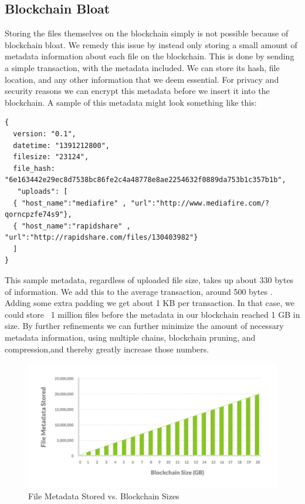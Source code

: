 \documentclass[a4paper,10pt]{article}
\begin{document}
\subsection{Blockchain Bloat}

Storing the files themselves on the blockchain simply is not possible because of blockchain bloat. We remedy this issue by instead only storing a small amount of metadata information about each file on the blockchain. This is done by sending a simple transaction, with the metadata included. We can store its hash, file location, and any other information that we deem essential. For privacy and security reasons we can encrypt this metadata before we insert it into the blockchain. A sample of this metadata might look something like this:\\

\begin{lstlisting}
{
  version: "0.1",
  datetime: "1391212800",
  filesize: "23124",
  file_hash: "6e163442e29ec8d7538bc86fe2c4a48778e8ae2254632f0889da753b1c357b1b",
   "uploads": [
  { "host_name":"mediafire" , "url":"http://www.mediafire.com/?qorncpzfe74s9"},
  { "host_name":"rapidshare" , "url":"http://rapidshare.com/files/130403982"}
  ]
}
\end{lstlisting}

This sample metadata, regardless of uploaded file size, takes up about 330 bytes of information. We add this to the average transaction, around 500 bytes \cite{12}. Adding some extra padding we get about 1 KB per transaction. In that case, we could store ~1 million files before the metadata in our blockchain reached 1 GB in size. By further refinements we can further minimize the amount of necessary metadata information, using multiple chains, blockchain pruning, and compression,and thereby greatly increase those numbers.

\begin{figure}[h!]
  \centering
      \includegraphics[width=\linewidth]{06}
  \caption{File Metadata Stored vs. Blockchain Sizes}
\end{figure}
\end{document}
